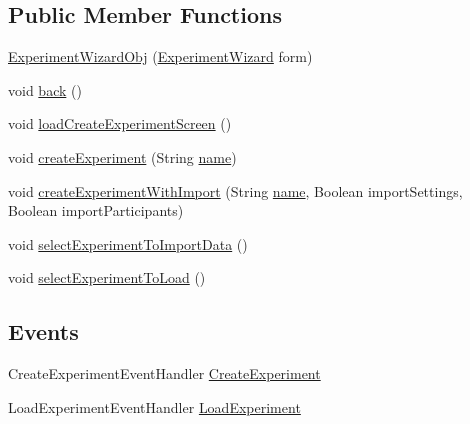 \subsection*{Public Member Functions}
\begin{DoxyCompactItemize}
\item 
\hyperlink{class_web_analyzer_1_1_u_i_1_1_interaction_objects_1_1_experiment_wizard_obj_a556f5d452c9c8f983949604ecdd9e9e5}{Experiment\+Wizard\+Obj} (\hyperlink{class_web_analyzer_1_1_u_i_1_1_experiment_wizard}{Experiment\+Wizard} form)
\item 
void \hyperlink{class_web_analyzer_1_1_u_i_1_1_interaction_objects_1_1_experiment_wizard_obj_a5df5c95c1b33e86c7b095a4af6861994}{back} ()
\item 
void \hyperlink{class_web_analyzer_1_1_u_i_1_1_interaction_objects_1_1_experiment_wizard_obj_ab31f1a51792e84018e1dcce87903551e}{load\+Create\+Experiment\+Screen} ()
\item 
void \hyperlink{class_web_analyzer_1_1_u_i_1_1_interaction_objects_1_1_experiment_wizard_obj_ade6772af7c7187e6296a727f11108581}{create\+Experiment} (String \hyperlink{_u_i_2_h_t_m_l_resources_2js_2src_2create__experiment_8js_adac2bcb4f01b574cbc63fe8ee2c56bf0}{name})
\item 
void \hyperlink{class_web_analyzer_1_1_u_i_1_1_interaction_objects_1_1_experiment_wizard_obj_a1e559426b9c210c4bc189c087869e466}{create\+Experiment\+With\+Import} (String \hyperlink{_u_i_2_h_t_m_l_resources_2js_2src_2create__experiment_8js_adac2bcb4f01b574cbc63fe8ee2c56bf0}{name}, Boolean import\+Settings, Boolean import\+Participants)
\item 
void \hyperlink{class_web_analyzer_1_1_u_i_1_1_interaction_objects_1_1_experiment_wizard_obj_a65595483af6122f00e4caa0b0bc5138a}{select\+Experiment\+To\+Import\+Data} ()
\item 
void \hyperlink{class_web_analyzer_1_1_u_i_1_1_interaction_objects_1_1_experiment_wizard_obj_a187c4039f4ed7c0bdca88b2abbebc606}{select\+Experiment\+To\+Load} ()
\end{DoxyCompactItemize}
\subsection*{Events}
\begin{DoxyCompactItemize}
\item 
Create\+Experiment\+Event\+Handler \hyperlink{class_web_analyzer_1_1_u_i_1_1_interaction_objects_1_1_experiment_wizard_obj_a95676a614efb19092a4522290e47ef96}{Create\+Experiment}
\item 
Load\+Experiment\+Event\+Handler \hyperlink{class_web_analyzer_1_1_u_i_1_1_interaction_objects_1_1_experiment_wizard_obj_a4ab54f4e59198b7ff3e9b91ad5049642}{Load\+Experiment}
\end{DoxyCompactItemize}
